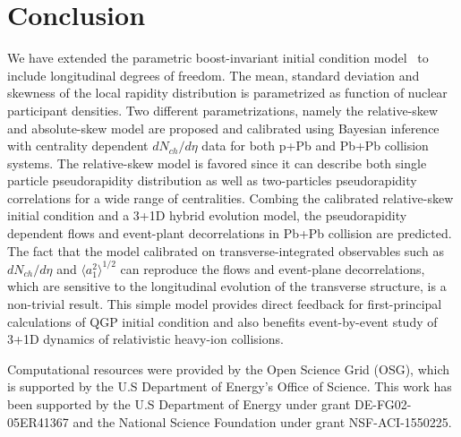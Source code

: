 \documentclass[3p,times,twocolumn]{elsarticle}
\begin{document}
\section{Conclusion}
\label{Conclusion}
We have extended the parametric boost-invariant initial condition model \trento~to include longitudinal degrees of freedom.
The mean, standard deviation and skewness of the local rapidity distribution is parametrized as function of nuclear participant densities.
Two different parametrizations, namely the relative-skew and absolute-skew model are proposed and calibrated using Bayesian inference with centrality dependent $dN_{ch}/d\eta$ data for both p+Pb and Pb+Pb collision systems.
The relative-skew model is favored since it can describe both single particle pseudorapidity distribution as well as two-particles pseudorapidity correlations for a wide range of centralities.
Combing the calibrated relative-skew initial condition and a 3+1D hybrid evolution model, the pseudorapidity dependent flows and event-plant decorrelations in Pb+Pb collision are predicted.
The fact that the model calibrated on transverse-integrated observables such as $dN_{ch}/d\eta$ and $\langle a_1^2\rangle^{1/2}$ can reproduce the flows and event-plane decorrelations, which are sensitive to the longitudinal evolution of the transverse structure, is a non-trivial result.
This simple model provides direct feedback for first-principal calculations of QGP initial condition and also benefits event-by-event study of 3+1D dynamics of relativistic heavy-ion collisions. 

Computational resources were provided by the Open Science Grid (OSG), which is supported by the U.S Department of Energy's Office of Science. This work has been supported by the U.S Department of Energy under grant DE-FG02-05ER41367 and the National Science Foundation under grant NSF-ACI-1550225.












\end{document}
